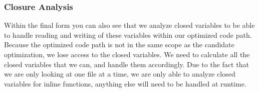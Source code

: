 \subsubsection{Closure Analysis}
Within the final form you can also see that we analyze closed variables to be able to handle reading and writing of these variables within our optimized code path. Because the optimized code path is not in the same scope as the candidate optimization, we lose access to the closed variables.  We need to calculate all the closed variables that we can, and handle them accordingly.  Due to the fact that we are only looking at one file at a time, we are only able to analyze closed variables for inline functions, anything else will need to be handled at runtime.  


